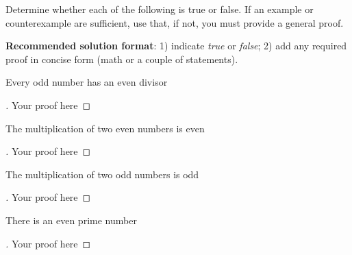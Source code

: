 \documentclass[12pt]{article}
\newenvironment{exercise}[2][Exercise]{\begin{trivlist}
\item[\hskip \labelsep {\bfseries #1}\hskip \labelsep {\bfseries #2.}]}{\end{trivlist}}
\newenvironment{solution}[1][{\color{red} Solution:}]{\begin{trivlist}
\item[\hskip \labelsep {\bfseries #1}\hskip \labelsep {\bfseries}]}{\end{trivlist}}
\begin{document}
\clearpage

\begin{exercise}{2}

Determine whether each of the following is true or false. If an example or counterexample are sufficient, use that, if not, you must provide a general proof.

\textbf{Recommended solution format}: 1) indicate \textit{true} or \textit{false}; 2) add any required proof in concise form (math or a couple of statements).

\begin{enumerate}[(a)]
    \item Every odd number has an even divisor
    \begin{solution} 
        \begin{proof}[\unskip\nopunct]
            Your proof here
        \end{proof}
    \end{solution}

    \item The multiplication of two even numbers is even
    \begin{solution} 
        \begin{proof}[\unskip\nopunct]
            Your proof here
        \end{proof}
    \end{solution}    
        
    \item The multiplication of two odd numbers is odd
    \begin{solution} 
        \begin{proof}[\unskip\nopunct]
            Your proof here
        \end{proof}
    \end{solution}

    \item There is an even prime number
    \begin{solution} 
        \begin{proof}[\unskip\nopunct]
            Your proof here
        \end{proof}
    \end{solution}

    
    
    \end{enumerate}
\end{exercise}
\end{document}
